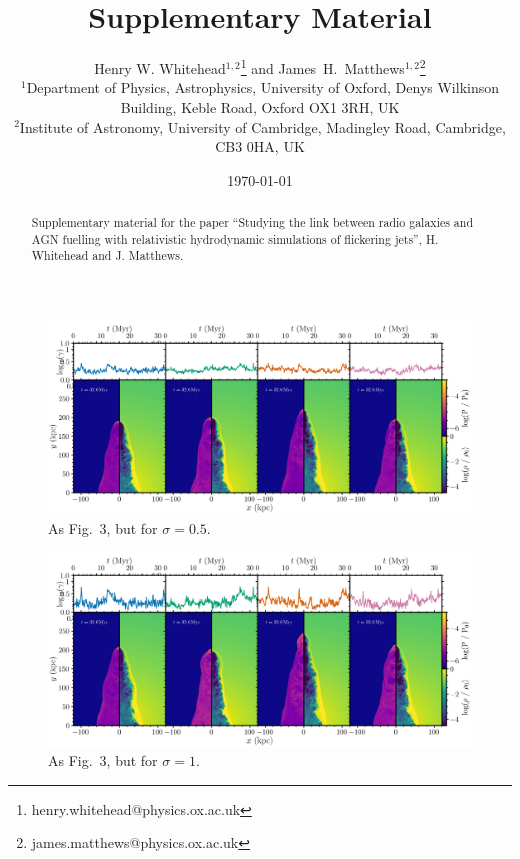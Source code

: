 \documentclass[fleqn,usenatbib,twocolumn]{mnras}
\title
[Supplementary Material]
{
Supplementary Material
}
\author[H. W. Whitehead, J.~H.~Matthews]{Henry W. Whitehead$^{1,2}$\thanks{henry.whitehead@physics.ox.ac.uk}
 and James~H.~Matthews$^{1,2}$\thanks{james.matthews@physics.ox.ac.uk} 
\\
$^{1}$Department of Physics, Astrophysics, University of Oxford, Denys Wilkinson Building, Keble Road, Oxford OX1 3RH, UK\\
$^2$Institute of Astronomy, University of Cambridge, Madingley Road, Cambridge, CB3 0HA, UK \\
}
\date{\today}
\begin{document}
\maketitle
\begin{abstract}
Supplementary material for the paper ``Studying the link between radio galaxies and AGN fuelling with relativistic hydrodynamic simulations of flickering jets'', H. Whitehead and J. Matthews.
\end{abstract}

\renewcommand\thefigure{S\arabic{figure}}


\label{firstpage}
\pagerange{\pageref{firstpage}--\pageref{lastpage}}
\maketitle
\begin{figure}
    \centering
    \includegraphics[width=0.97\linewidth]{quad05.png}
    \caption{
    As Fig.~3, but for $\sigma=0.5$.
    }
    \label{fig:4panel_sigma0.5}
\end{figure}

\begin{figure}
    \centering
    \includegraphics[width=0.97\linewidth]{quad1.png}
    \caption{
    As Fig.~3, but for $\sigma=1$.
    }
    \label{fig:4panel_sigma1}
\end{figure}
\end{document}
